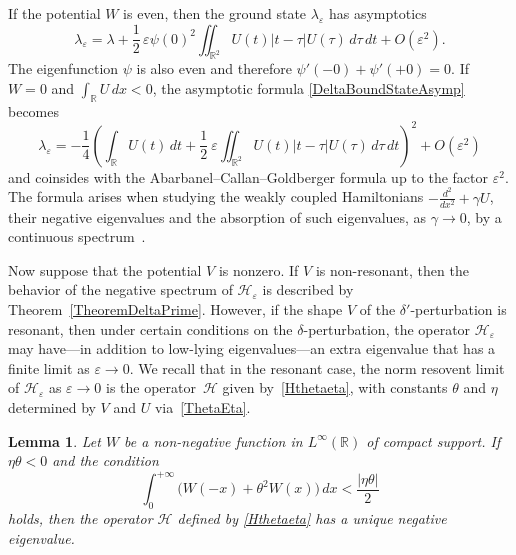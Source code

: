 \documentclass[reqno]{amsart}
\newtheorem{lem}{Lemma}
\theoremstyle{definition}
\theoremstyle{remark}
\numberwithin{equation}{section}
\newcommand{\Real}{\mathbb R}
\newcommand{\eps}{\varepsilon}
\newcommand{\cH}{\mathcal{H}}
\begin{document}
If the potential $W$ is even, then the ground state $\lambda_\eps$ has asymptotics
\begin{equation*}
	\lambda_\eps=\lambda+\frac12\,\eps\psi(0)^2\iint_{\Real^2} U(t)|t-\tau|U(\tau)\,d\tau\,dt+O(\eps^2).
\end{equation*}
The eigenfunction $\psi$ is also even and therefore $\psi'(-0)+\psi'(+0)=0$.
If $W=0$ and $\int_{\Real}U\,dx<0$, the asymptotic formula \eqref{DeltaBoundStateAsymp} becomes
\begin{equation*}
	\lambda_\eps=-\frac14\left(\int_{\Real} U(t)\,dt+\frac12\:\eps\iint_{\Real^2} U(t)|t-\tau|U(\tau)\,d\tau\,dt\right)^2+O(\eps^2)
\end{equation*}
and coinsides with the Abarbanel--Callan--Goldberger formula up to the factor $\eps^2$. The formula arises when studying the weakly coupled Hamiltonians $-\frac{d^2}{dx^2} +\gamma U$, their negative eigenvalues and the absorption of such eigenvalues, as $\gamma\to 0$, by a continuous spectrum~\cite{Simon1976}.

Now suppose that the potential $V$ is nonzero. If $V$ is non-resonant, then the behavior of the negative spectrum of $\cH_\eps$ is described by Theorem~\ref{TheoremDeltaPrime}. However, if the shape $V$ of the $\delta'$-perturbation is resonant, then under certain conditions on the $\delta$-perturbation, the operator $\cH_\eps$ may have---in addition to low-lying eigenvalues---an extra eigenvalue that has a finite limit as $\eps\to 0$. We recall that in the resonant case, the norm resovent limit of $\cH_\eps$ as $\eps\to0$ is the operator~$\cH$ given by~\eqref{Hthetaeta}, with constants $\theta$ and $\eta$ determined by $V$ and $U$ via~\eqref{ThetaEta}.

\begin{lem}
Let $W$ be a non-negative function in $L^\infty(\Real)$ of compact support.
If $\eta\theta<0$ and the condition
\begin{equation}\label{CondWThetaW}
   \int_0^{+\infty}\big(W(-x)+\theta^2 W(x)\big)\,dx<\frac{|\eta\theta|}{2}
\end{equation}
holds, then the operator $\cH$ defined by \eqref{Hthetaeta} has a unique negative eigenvalue.
\end{lem}
\end{document}
